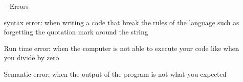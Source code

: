 
-- Errors

syntax error:
    when writing a code that break the rules of the language such as forgetting the quotation mark around the string

Run time error:
    when the computer is not able to execute your code like when you divide by zero

Semantic error:
    when the output of the program is not what you expected